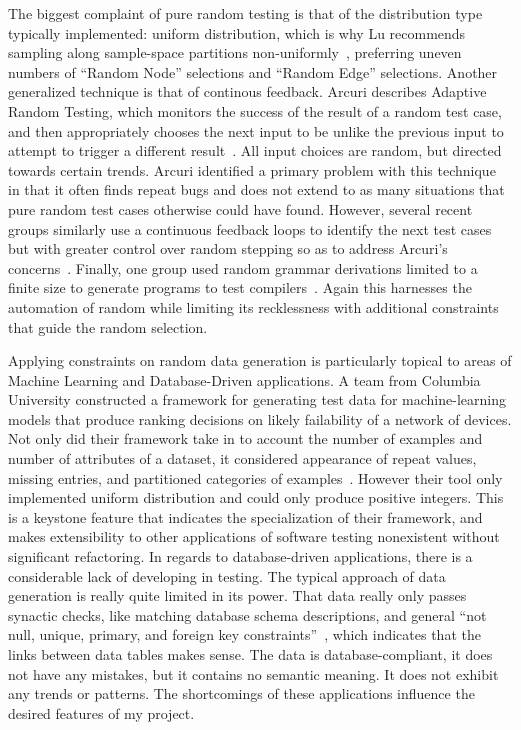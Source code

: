 The biggest complaint of pure random testing is that of the distribution type typically implemented: uniform distribution, which is why Lu recommends sampling along sample-space partitions non-uniformly~\cite{Lu:2018:URS:3184558.3186240}, preferring uneven numbers of ``Random Node'' selections and ``Random Edge'' selections. Another generalized technique is that of continous feedback. Arcuri describes Adaptive Random Testing, which monitors the success of the result of a random test case, and then appropriately chooses the next input to be unlike the previous input to attempt to trigger a different result~\cite{Arcuri:2011:ART:2001420.2001452}. All input choices are random, but directed towards certain trends. Arcuri identified a primary problem with this technique in that it often finds repeat bugs and does not extend to as many situations that pure random test cases otherwise could have found. However, several recent  groups similarly use a continuous feedback loops to identify the next test cases but with greater control over random stepping so as to address Arcuri's concerns~\cite{Yatoh:2015:FRT:2771783.2771805,Hughes:2016:FMB:2896921.2896928,Sabor:2015:ART:2819261.2819271}. Finally, one group used random grammar derivations limited to a finite size to generate programs to test compilers~\cite{Palka:2011:TOC:1982595.1982615}. Again this harnesses the automation of random while limiting its recklessness with additional constraints that guide the random selection.

Applying constraints on random data generation is particularly topical to areas of Machine Learning and Database-Driven applications. A team from Columbia University constructed a framework for generating test data for machine-learning models that produce ranking decisions on likely failability of a network of devices. Not only did their framework take in to account the number of examples and number of attributes of a dataset, it considered appearance of repeat values, missing entries, and partitioned categories of examples~\cite{Murphy:2007:PRT:1292414.1292425,Murphy:Kaiser}. However their tool only implemented uniform distribution and could only produce positive integers. This is a keystone feature that indicates the specialization of their framework, and makes extensibility to other applications of software testing nonexistent without significant refactoring. In regards to database-driven applications, there is a considerable lack of developing in testing. The typical approach of data generation is really quite limited in its power. That data really only passes synactic checks, like matching database schema descriptions, and general ``not null, unique, primary, and foreign key constraints''~\cite{Haller:2010:TDC:1838126.1838132}, which indicates that the links between data tables makes sense. The data is database-compliant, it does not have any mistakes, but it contains no semantic meaning. It does not exhibit any trends or patterns. The shortcomings of these applications influence the desired features of my project.
